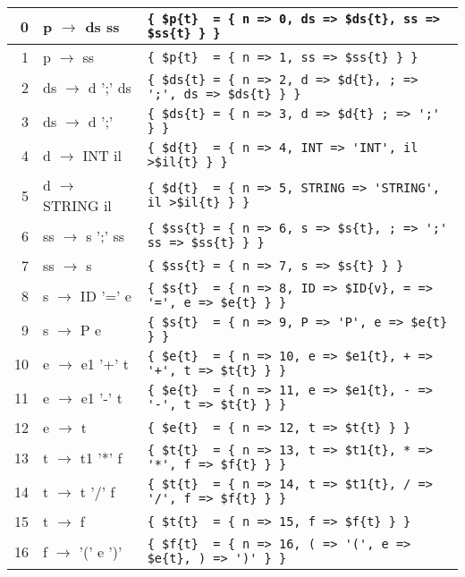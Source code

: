 \vspace{0.5cm}
\begin{small}
\begin{tabular}{|r|ll|}
\hline
0 & p  $\rightarrow$  ds  ss     & \verb|{ $p{t}  = { n => 0, ds => $ds{t}, ss => $ss{t} } }|\\
\hline
1 & p  $\rightarrow$  ss         & \verb|{ $p{t}  = { n => 1, ss => $ss{t} } }|\\
\hline
2 & ds $\rightarrow$ d  ';'  ds  & \verb|{ $ds{t} = { n => 2, d => $d{t}, ; => ';', ds => $ds{t} } }|\\
\hline
3 & ds $\rightarrow$  d ';'      & \verb|{ $ds{t} = { n => 3, d => $d{t} ; => ';' } }|\\
\hline
4 & d  $\rightarrow$ INT  il     & \verb|{ $d{t}  = { n => 4, INT => 'INT', il >$il{t} } }|\\
\hline
5 & d  $\rightarrow$  STRING  il & \verb|{ $d{t}  = { n => 5, STRING => 'STRING', il >$il{t} } }|\\
\hline
6 & ss $\rightarrow$ s  ';'  ss  & \verb|{ $ss{t} = { n => 6, s => $s{t}, ; => ';' ss => $ss{t} } }|\\
\hline
7 & ss $\rightarrow$  s          & \verb|{ $ss{t} = { n => 7, s => $s{t} } }|\\
\hline
8 & s  $\rightarrow$ ID '=' e    & \verb|{ $s{t}  = { n => 8, ID => $ID{v}, = => '=', e => $e{t} } }|\\
\hline
9 & s  $\rightarrow$  P  e       & \verb|{ $s{t}  = { n => 9, P => 'P', e => $e{t} } }|\\
\hline
10 & e $\rightarrow$ e1 '+' t    & \verb|{ $e{t}  = { n => 10, e => $e1{t}, + => '+', t => $t{t} } }|\\
\hline
11 & e $\rightarrow$ e1 '-' t    & \verb|{ $e{t}  = { n => 11, e => $e1{t}, - => '-', t => $t{t} } }|\\
\hline
12 & e $\rightarrow$ t           & \verb|{ $e{t}  = { n => 12, t => $t{t} } }|\\
\hline
13 & t $\rightarrow$ t1 '*' f    & \verb|{ $t{t}  = { n => 13, t => $t1{t}, * => '*', f => $f{t} } }|\\
\hline
14 & t $\rightarrow$ t '/' f     & \verb|{ $t{t}  = { n => 14, t => $t1{t}, / => '/', f => $f{t} } }|\\
\hline
15 & t $\rightarrow$ f           & \verb|{ $t{t}  = { n => 15, f => $f{t} } }|\\
\hline
16 & f $\rightarrow$ '(' e ')'   & \verb|{ $f{t}  = { n => 16, ( => '(', e => $e{t}, ) => ')' } }|\\
\hline

\end{tabular}
\end{small}
